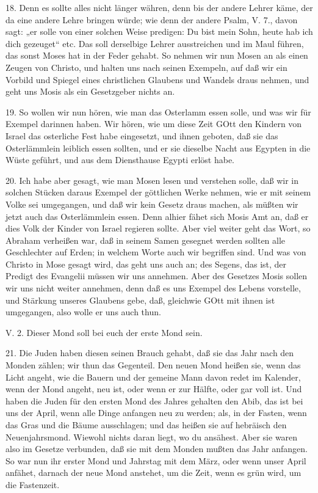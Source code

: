 18. Denn es sollte alles nicht länger währen, denn bis der andere Lehrer käme, der da eine andere Lehre bringen würde; wie denn der andere Psalm, V. 7., davon sagt: „er solle von einer solchen Weise predigen: Du bist mein Sohn, heute hab ich dich gezeuget“ etc. Das soll derselbige Lehrer ausstreichen und im Maul führen, das sonst Moses hat in der Feder gehabt. So nehmen wir nun Mosen an als einen Zeugen von Christo, und halten uns nach seinen Exempeln, auf daß wir ein Vorbild und Spiegel eines christlichen Glaubens und Wandels draus nehmen, und geht uns Mosis als ein Gesetzgeber nichts an.

19. So wollen wir nun hören, wie man das Osterlamm essen solle, und was wir für Exempel darinnen haben. Wir hören, wie um diese Zeit GOtt den Kindern von Israel das osterliche Fest habe eingesetzt, und ihnen geboten, daß sie das Osterlämmlein leiblich essen sollten, und er sie dieselbe Nacht aus Egypten in die Wüste geführt, und aus dem Diensthause Egypti erlöst habe.

20. Ich habe aber gesagt, wie man Mosen lesen und verstehen solle, daß wir in solchen Stücken daraus Exempel der göttlichen Werke nehmen, wie er mit seinem Volke sei umgegangen, und daß wir kein Gesetz draus machen, als müßten wir jetzt auch das Osterlämmlein essen. Denn alhier fähet sich Mosis Amt an, daß er dies Volk der Kinder von Israel regieren sollte. Aber viel weiter geht das Wort, so Abraham verheißen war, daß in seinem Samen gesegnet werden sollten alle Geschlechter auf Erden; in welchem Worte auch wir begriffen sind. Und was von Christo in Mose gesagt wird, das geht uns auch an; des Segens, das ist, der Predigt des Evangelii müssen wir uns annehmen. Aber des Gesetzes Mosis sollen wir uns nicht weiter annehmen, denn daß es uns Exempel des Lebens vorstelle, und Stärkung unseres Glaubens gebe, daß, gleichwie GOtt mit ihnen ist umgegangen, also wolle er uns auch thun.

\begin{schriftzitat}
V. 2. Dieser Mond soll bei euch der erste Mond sein.
\end{schriftzitat}

21. Die Juden haben diesen seinen Brauch gehabt, daß sie das Jahr nach den Monden zählen; wir thun das Gegenteil. Den neuen Mond heißen sie, wenn das Licht angeht, wie die Bauern und der gemeine Mann davon redet im Kalender, wenn der Mond angeht, neu ist, oder wenn er zur Hälfte, oder gar voll ist. Und haben die Juden für den ersten Mond des Jahres gehalten den Abib, das ist bei uns der April, wenn alle Dinge anfangen neu zu werden; als, in der Fasten, wenn das Gras und die Bäume ausschlagen; und das heißen sie auf hebräisch den Neuenjahrsmond. Wiewohl nichts daran liegt, wo du ansähest. Aber sie waren also im Gesetze verbunden, daß sie mit dem Monden mußten das Jahr anfangen. So war nun ihr erster Mond und Jahrstag mit dem März, oder wenn unser April anfähet, darnach der neue Mond anstehet, um die Zeit, wenn es grün wird, um die Fastenzeit.

